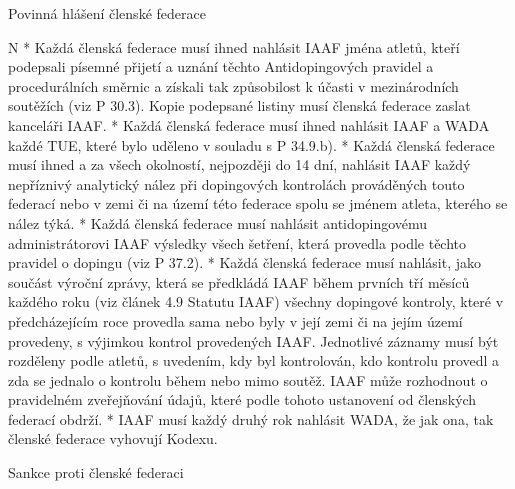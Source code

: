 \secc Povinná hlášení členské federace

\begitems \style N
* Každá členská federace musí ihned nahlásit IAAF jména atletů, kteří podepsali písemné přijetí a uznání těchto Antidopingových pravidel a procedurálních směrnic a získali tak způsobilost k účasti v mezinárodních soutěžích (viz P 30.3). Kopie podepsané listiny musí členská federace zaslat kanceláři IAAF.
* Každá členská federace musí ihned nahlásit IAAF a WADA každé TUE, které bylo uděleno v souladu s P 34.9.b).
* Každá členská federace musí ihned a za všech okolností, nejpozději do 14 dní, nahlásit IAAF každý nepříznivý analytický nález při dopingových kontrolách prováděných touto federací nebo v zemi či na území této federace spolu se jménem atleta, kterého se nález týká.
* Každá členská federace musí nahlásit antidopingovému administrátorovi IAAF výsledky všech šetření, která provedla podle těchto pravidel o dopingu (viz P 37.2).
* Každá členská federace musí nahlásit, jako součást výroční zprávy, která se předkládá IAAF během prvních tří měsíců každého roku (viz článek 4.9 Statutu IAAF) všechny dopingové kontroly, které v předcházejícím roce provedla sama nebo byly v její zemi či na jejím území provedeny, s výjimkou kontrol provedených IAAF. Jednotlivé záznamy musí být rozděleny podle atletů, s uvedením, kdy byl kontrolován, kdo kontrolu provedl a zda se jednalo o kontrolu během nebo mimo soutěž. IAAF může rozhodnout o pravidelném zveřejňování údajů, které podle tohoto ustanovení od členských federací obdrží.
* IAAF musí každý druhý rok nahlásit WADA, že jak ona, tak členské federace vyhovují Kodexu.
\enditems

\secc Sankce proti členské federaci

